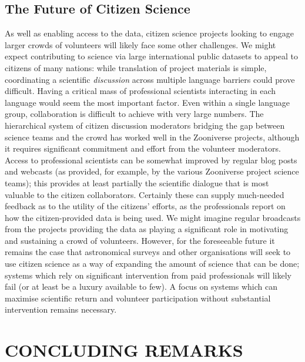 \documentclass{ar2e}
\begin{document}
 


\subsection{The Future of Citizen Science}

As well as enabling access to the data, citizen science projects looking to
engage larger crowds of volunteers will likely face some other  challenges. We
might expect contributing to science via large international public datasets to
appeal to citizens of many nations: while translation of project materials is
simple,  coordinating a scientific \textit{discussion} across multiple language
barriers could prove difficult. Having a critical mass of professional
scientists interacting in each language would seem the most important factor.
Even within a single language group, collaboration is difficult to achieve with 
very large numbers. The hierarchical system of citizen discussion  moderators
bridging the gap between science teams and the crowd has worked well in the
Zooniverse projects, although it requires significant commitment and effort from
the volunteer moderators. Access to professional scientists can be somewhat
improved by regular blog posts and  webcasts (as provided, for example, by the
various Zooniverse project science teams);  this provides at least partially the
scientific dialogue that is most valuable to the citizen collaborators.
Certainly these can supply much-needed feedback as to the utility of the
citizens' efforts, as the professionals report on how the citizen-provided data
is being used. We might imagine regular broadcasts from the projects providing
the data as playing a significant role in motivating and sustaining a crowd of
volunteers. However, for the foreseeable future it remains the case that
astronomical surveys and other organisations will seek to use citizen science as
a  way of expanding the amount of science that can be done; systems which rely
on significant intervention from paid professionals will likely fail (or at
least be a luxury available to few). A focus on systems which can maximise
scientific return and volunteer participation without substantial intervention
remains necessary. 


\section{CONCLUDING REMARKS}
\label{sec:conclusions}
\end{document}
